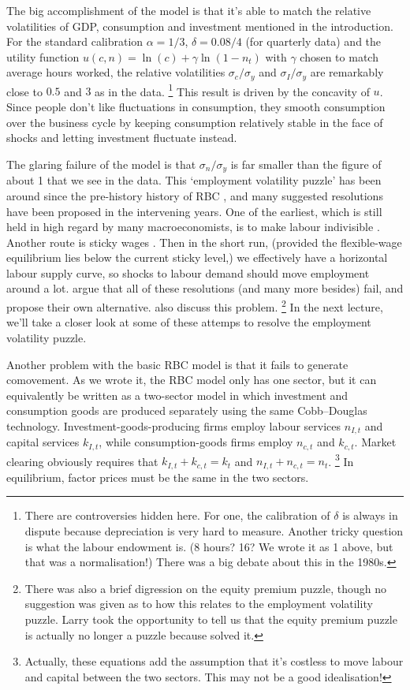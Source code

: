\documentclass[11pt,letterpaper,reqno,oneside]{article}
\begin{document}
The big accomplishment of the model is that it's able to match the relative volatilities of GDP, consumption and investment mentioned in the introduction. For the standard calibration $\alpha=1/3$, $\delta=0.08/4$ (for quarterly data) and the utility function $u(c,n) = \ln(c) + \gamma \ln(1-n_t)$ with $\gamma$ chosen to match average hours worked, the relative volatilities $\sigma_c/\sigma_y$ and $\sigma_I/\sigma_y$ are remarkably close to $0.5$ and $3$ as in the data.%
	\footnote{There are controversies hidden here. For one, the calibration of $\delta$ is always in dispute because depreciation is very hard to measure. Another tricky question is what the labour endowment is. (8 hours? 16? We wrote it as 1 above, but that was a normalisation!) There was a big debate about this in the 1980s.}
This result is driven by the concavity of $u$. Since people don't like fluctuations in consumption, they smooth consumption over the business cycle by keeping consumption relatively stable in the face of shocks and letting investment fluctuate instead.


The glaring failure of the model is that $\sigma_n/\sigma_y$ is far smaller than the figure of about 1 that we see in the data. This `employment volatility puzzle' has been around since the pre-history history of RBC \parencite{LucasRapping1969}, and many suggested resolutions have been proposed in the intervening years. One of the earliest, which is still held in high regard by many macroeconomists, is to make labour indivisible \parencite{Rogerson1988}. Another route is sticky wages \parencite{Hall2005}. Then in the short run, (provided the flexible-wage equilibrium lies below the current sticky level,) we effectively have a horizontal labour supply curve, so shocks to labour demand should move employment around a lot. \textcite{ChristianoEichenbaumTrabandt2015} argue that all of these resolutions (and many more besides) fail, and propose their own alternative. \textcite{ChristianoTrabandtWalentin2010} also discuss this problem.%
	\footnote{There was also a brief digression on the equity premium puzzle, though no suggestion was given as to how this relates to the employment volatility puzzle. Larry took the opportunity to tell us that the equity premium puzzle is actually no longer a puzzle because \textcite{BoldrinChristianoFisher2001} solved it.}
In the next lecture, we'll take a closer look at some of these attemps to resolve the employment volatility puzzle.


Another problem with the basic RBC model is that it fails to generate comovement. As we wrote it, the RBC model only has one sector, but it can equivalently be written as a two-sector model in which investment and consumption goods are produced separately using the same Cobb--Douglas technology. Investment-goods-producing firms employ labour services $n_{I,t}$ and capital services $k_{I,t}$, while consumption-goods firms employ $n_{c,t}$ and $k_{c,t}$. Market clearing obviously requires that $k_{I,t} + k_{c,t} = k_t$ and $n_{I,t} + n_{c,t} = n_t$.%
	\footnote{Actually, these equations add the assumption that it's costless to move labour and capital between the two sectors. This may not be a good idealisation!}
In equilibrium, factor prices must be the same in the two sectors. 
\end{document}
